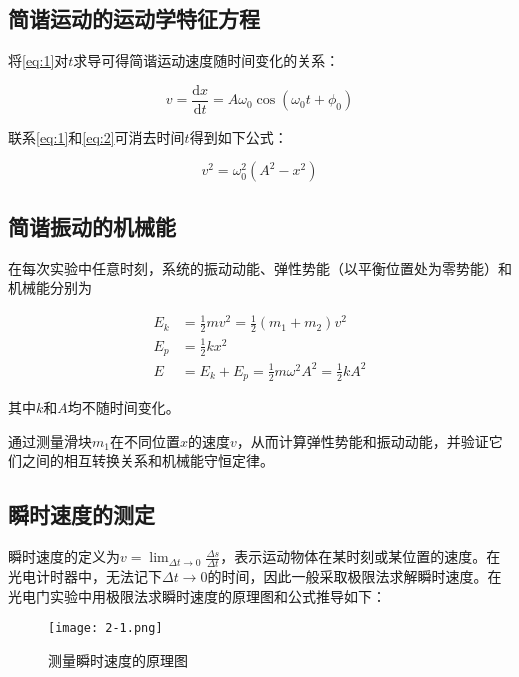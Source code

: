 \documentclass[12pt]{article}
\begin{document}
\subsection{简谐运动的运动学特征方程}
将\ref{eq:1}对$t$求导可得简谐运动速度随时间变化的关系：

\begin{equation}\label{eq:2}
    v=\frac{\mathrm{d}x}{\mathrm{d}t}=A\omega_0\cos(\omega_0t+\phi_0)
\end{equation}

联系\ref{eq:1}和\ref{eq:2}可消去时间$t$得到如下公式：

\begin{equation}\label{eq:3}
    v^2=\omega_0^2(A^2-x^2)
\end{equation}

\subsection{简谐振动的机械能}

在每次实验中任意时刻，系统的振动动能、弹性势能（以平衡位置处为零势能）和机械能分别为

\begin{equation}
    \begin{aligned}
        E_k&=\frac{1}{2}mv^2=\frac{1}{2}(m_1+m_2)v^2 \\
        E_p&=\frac{1}{2}kx^2 \\
        E&=E_k+E_p=\frac{1}{2}m\omega^2A^2=\frac{1}{2}kA^2
    \end{aligned}
\end{equation}

其中$k$和$A$均不随时间变化。

通过测量滑块$m_1$在不同位置$x$的速度$v$，从而计算弹性势能和振动动能，并验证它们之间的相互转换关系和机械能守恒定律。

\subsection{瞬时速度的测定}
瞬时速度的定义为$v=\lim_{\Delta t \to 0}\frac{\Delta s}{\Delta t}$，表示运动物体在某时刻或某位置的速度。在光电计时器中，无法记下$\Delta t \to 0$的时间，因此一般采取极限法求解瞬时速度。在光电门实验中用极限法求瞬时速度的原理图和公式推导如下：

\begin{figure}[htbp]
    \centering
    \texttt{[image: 2-1.png]}
    \caption{测量瞬时速度的原理图}
\end{figure}
\end{document}

